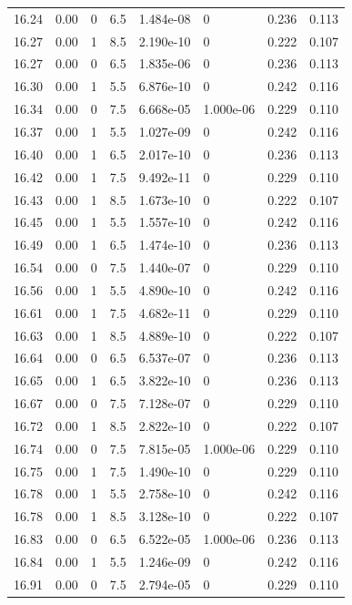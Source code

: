\documentclass[preview]{standalone}
\begin{document}
{{{{{{{{{{{{{{\begin{tabular}{L{1.2cm}C{1.2cm} C{0.3cm}C{0.5cm} C{1.4cm}C{1.4cm} C{1.4cm}C{1.4cm}}
  16.24  &  0.00  & 0     & 6.5 &  1.484e-08  & 0  & 0.236 &  0.113   \\ 
  16.27  &  0.00  & 1     & 8.5 &  2.190e-10  & 0  & 0.222 &  0.107   \\ 
  16.27  &  0.00  & 0     & 6.5 &  1.835e-06  & 0  & 0.236 &  0.113   \\ 
  16.30  &  0.00  & 1     & 5.5 &  6.876e-10  & 0  & 0.242 &  0.116   \\ 
  16.34  &  0.00  & 0     & 7.5 &  6.668e-05  & 1.000e-06  & 0.229 &  0.110   \\ 
  16.37  &  0.00  & 1     & 5.5 &  1.027e-09  & 0  & 0.242 &  0.116   \\ 
  16.40  &  0.00  & 1     & 6.5 &  2.017e-10  & 0  & 0.236 &  0.113   \\ 
  16.42  &  0.00  & 1     & 7.5 &  9.492e-11  & 0  & 0.229 &  0.110   \\ 
  16.43  &  0.00  & 1     & 8.5 &  1.673e-10  & 0  & 0.222 &  0.107   \\ 
  16.45  &  0.00  & 1     & 5.5 &  1.557e-10  & 0  & 0.242 &  0.116   \\ 
  16.49  &  0.00  & 1     & 6.5 &  1.474e-10  & 0  & 0.236 &  0.113   \\ 
  16.54  &  0.00  & 0     & 7.5 &  1.440e-07  & 0  & 0.229 &  0.110   \\ 
  16.56  &  0.00  & 1     & 5.5 &  4.890e-10  & 0  & 0.242 &  0.116   \\ 
  16.61  &  0.00  & 1     & 7.5 &  4.682e-11  & 0  & 0.229 &  0.110   \\ 
  16.63  &  0.00  & 1     & 8.5 &  4.889e-10  & 0  & 0.222 &  0.107   \\ 
  16.64  &  0.00  & 0     & 6.5 &  6.537e-07  & 0  & 0.236 &  0.113   \\ 
  16.65  &  0.00  & 1     & 6.5 &  3.822e-10  & 0  & 0.236 &  0.113   \\ 
  16.67  &  0.00  & 0     & 7.5 &  7.128e-07  & 0  & 0.229 &  0.110   \\ 
  16.72  &  0.00  & 1     & 8.5 &  2.822e-10  & 0  & 0.222 &  0.107   \\ 
  16.74  &  0.00  & 0     & 7.5 &  7.815e-05  & 1.000e-06  & 0.229 &  0.110   \\ 
  16.75  &  0.00  & 1     & 7.5 &  1.490e-10  & 0  & 0.229 &  0.110   \\ 
  16.78  &  0.00  & 1     & 5.5 &  2.758e-10  & 0  & 0.242 &  0.116   \\ 
  16.78  &  0.00  & 1     & 8.5 &  3.128e-10  & 0  & 0.222 &  0.107   \\ 
  16.83  &  0.00  & 0     & 6.5 &  6.522e-05  & 1.000e-06  & 0.236 &  0.113   \\ 
  16.84  &  0.00  & 1     & 5.5 &  1.246e-09  & 0  & 0.242 &  0.116   \\ 
  16.91  &  0.00  & 0     & 7.5 &  2.794e-05  & 0  & 0.229 &  0.110   \\ 
\hline 
\end{tabular} 

}}}}}}}}}}}}}}
\end{document}
